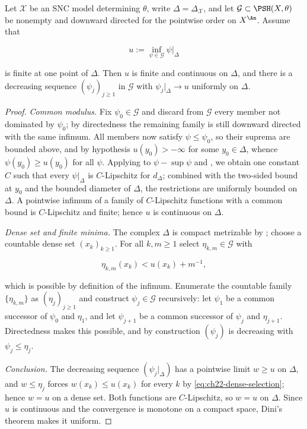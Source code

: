 \begin{proposition}
\label{prop:ch22-fixed-skeleton-decreasing}
Let \(\mathcal X\) be an SNC model determining \(\theta\), write
\(\Delta=\Delta_{\mathcal X}\), and let
\(\mathcal G\subset\PSH(X,\theta)\) be nonempty and downward directed for
the pointwise order on \(X^{\An}\).  Assume that

\[
 u:=\inf_{\psi\in\mathcal G}\psi|_\Delta
\]

is finite at one point of \(\Delta\).  Then \(u\) is finite and continuous
on \(\Delta\), and there is a decreasing sequence
\((\psi_j)_{j\geq1}\) in \(\mathcal G\) with
\(\psi_j|_\Delta\to u\) uniformly on \(\Delta\).
\end{proposition}

\begin{proof}
\emph{Common modulus.}  Fix \(\psi_0\in\mathcal G\) and discard from
\(\mathcal G\) every member not dominated by \(\psi_0\); by directedness the
remaining family is still downward directed with the same infimum.  All
members now satisfy \(\psi\leq\psi_0\), so their suprema are bounded above,
and by hypothesis \(u(y_0)>-\infty\) for some \(y_0\in\Delta\), whence
\(\psi(y_0)\geq u(y_0)\) for all \(\psi\).  Applying
 to
\(\psi-\sup\psi\) and , we obtain one
constant \(C\) such that every \(\psi|_\Delta\) is \(C\)-Lipschitz for
\(d_\Delta\); combined with the two-sided bound at \(y_0\) and the bounded
diameter of \(\Delta\), the restrictions are uniformly bounded on
\(\Delta\).  A pointwise infimum of a family of \(C\)-Lipschitz functions
with a common bound is \(C\)-Lipschitz and finite; hence \(u\) is continuous
on \(\Delta\).

\emph{Dense set and finite minima.}  The complex \(\Delta\) is compact
metrizable by ; choose a countable dense set
\((x_k)_{k\geq1}\).  For all \(k,m\geq1\) select
\(\eta_{k,m}\in\mathcal G\) with

\[
                     \eta_{k,m}(x_k)<u(x_k)+m^{-1},
\tag{22.81}\label{eq:ch22-dense-selection}
\]

which is possible by definition of the infimum.  Enumerate the countable
family \(\{\eta_{k,m}\}\) as \((\eta_j)_{j\geq1}\) and construct
\(\psi_j\in\mathcal G\) recursively: let \(\psi_1\) be a common successor of
\(\psi_0\) and \(\eta_1\), and let \(\psi_{j+1}\) be a common successor of
\(\psi_j\) and \(\eta_{j+1}\).  Directedness makes this possible, and by
construction \((\psi_j)\) is decreasing with
\(\psi_j\leq\eta_j\).

\emph{Conclusion.}  The decreasing sequence \((\psi_j|_\Delta)\) has a
pointwise limit \(w\geq u\) on \(\Delta\), and \(w\leq\eta_j\) forces
\(w(x_k)\leq u(x_k)\) for every \(k\) by
\eqref{eq:ch22-dense-selection}; hence \(w=u\) on a dense set.  Both
functions are \(C\)-Lipschitz, so \(w=u\) on \(\Delta\).  Since \(u\) is
continuous and the convergence is monotone on a compact space, Dini's
theorem  makes it uniform.
\end{proof}

